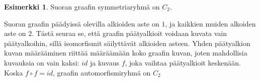 \documentclass[a4paper, 12pt]{article}
\theoremstyle{definition}
\newtheorem{example}[mydef]{Esimerkki}
\theoremstyle{plain}
\begin{document}
\begin{example}
Suoran graafin symmetriaryhmä on $C_2$.

\begin{center}
\end{center}

Suoran graafin päädyissä olevilla alkioiden aste on $1$, ja kaikkien muiden alkoiden aste on $2$. Tästä seuraa se, että graafin päätyalkioit voidaan kuvata vain päätyalkoihin, sillä isomorfismit säilyttävät alkioiden asteen. Yhden päätyalkion kuvan määrääminen riittää määräämään koko graafin kuvan, joten mahdollisia kuvauksia on vain kaksi: $id$ ja kuvaus $f$, joka vaihtaa päätyalkioit keskenään. Koska $f \circ f = id$, graafin automorfismiryhmä on $C_2$

\end{example}
\end{document}
